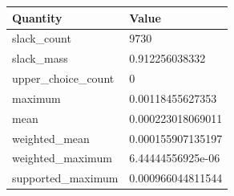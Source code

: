 \begin{tabular}{ll}
\hline
Quantity & Value \\
\hline
slack\_count & 9730 \\
slack\_mass & 0.912256038332 \\
upper\_choice\_count & 0 \\
maximum & 0.00118455627353 \\
mean & 0.000223018069011 \\
weighted\_mean & 0.000155907135197 \\
weighted\_maximum & 6.44444556925e-06 \\
supported\_maximum & 0.000966044811544 \\
\hline
\end{tabular}
